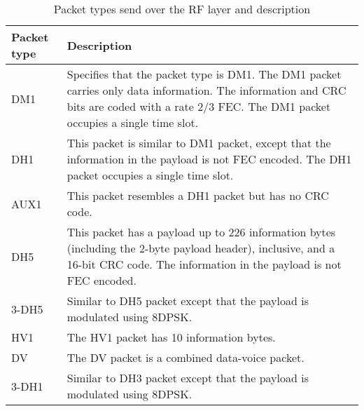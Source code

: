 
\begin{table}[h!]
\label{tab:typetable}
\begin{tabular}{|l|p{10cm}|}
\hline
Packet type & Description \\
\hline
DM1 & Specifies that the packet type is DM1. The DM1 packet carries only data information. The information and CRC bits are coded with a rate 2/3 FEC. The DM1 packet occupies a single time slot. \\ \hline
DH1 &  This packet is similar to DM1 packet, except that the information in the payload is not FEC encoded. The DH1 packet occupies a single time slot.  \\ \hline
AUX1 & This packet resembles a DH1 packet but has no CRC code. \\ \hline
DH5 &  This packet has a payload up to 226 information bytes (including the 2-byte payload header), inclusive, and a 16-bit CRC code. The information in the payload is not FEC encoded. \\ \hline
3-DH5 & Similar to DH5 packet except that the payload is modulated using 8DPSK. \\ \hline
HV1 &  The HV1 packet has 10 information bytes. \\ \hline
DV & The DV packet is a combined data-voice packet. \\ \hline
3-DH1 & Similar to DH3 packet except that the payload is modulated using 8DPSK. \\ \hline
\end{tabular}
\caption{Packet types send over the RF layer and description}
\end{table}